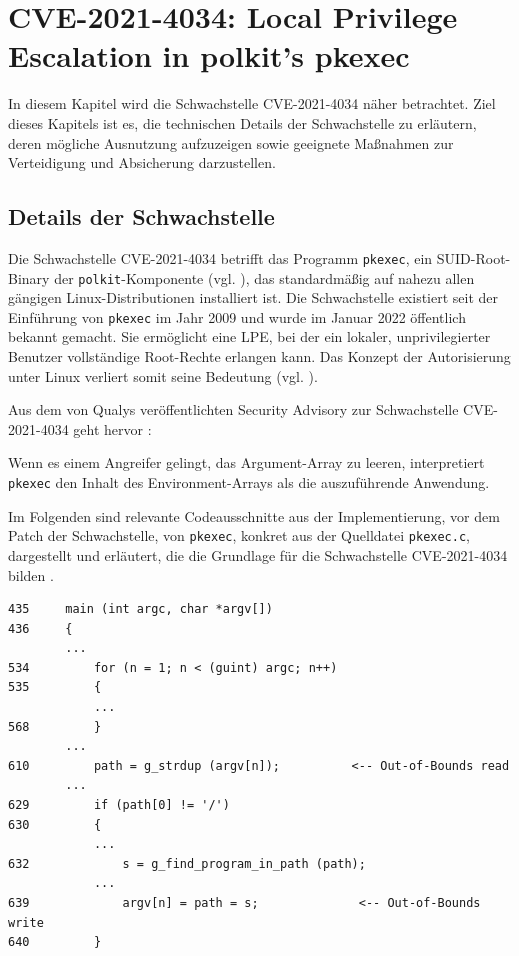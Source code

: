 \documentclass[oneside,11pt,a4paper,article,german]{memoir}
\begin{document}
\chapter{CVE-2021-4034: Local Privilege Escalation in polkit's pkexec}
In diesem Kapitel wird die Schwachstelle CVE-2021-4034 \cite{n3_cve_2021_4034} näher betrachtet.
Ziel dieses Kapitels ist es, die technischen Details der Schwachstelle zu erläutern, deren mögliche Ausnutzung aufzuzeigen
sowie geeignete Maßnahmen zur Verteidigung und Absicherung darzustellen.

\section{Details der Schwachstelle}

Die Schwachstelle CVE-2021-4034 betrifft das Programm \texttt{pkexec}, ein SUID-Root-Binary der \texttt{polkit}-Komponente (vgl. \cite{n2_ubuntuusers.de_polkit}),
das standardmäßig auf nahezu allen gängigen Linux-Distributionen installiert ist. Die Schwachstelle
existiert seit der Einführung von \texttt{pkexec} im Jahr 2009 und wurde im Januar 2022 öffentlich bekannt gemacht.
Sie ermöglicht eine LPE, bei der ein lokaler, unprivilegierter Benutzer vollständige
Root-Rechte erlangen kann. Das Konzept der Autorisierung unter Linux verliert somit seine Bedeutung (vgl. \cite{c16_qualys}).
\par
Aus dem von Qualys veröffentlichten Security Advisory zur Schwachstelle CVE-2021-4034 geht hervor \cite{c16_qualys}:
\par
Wenn es einem Angreifer gelingt, das Argument-Array zu leeren, interpretiert \texttt{pkexec} den Inhalt des Environment-Arrays
als die auszuführende Anwendung.
\par
Im Folgenden sind relevante Codeausschnitte aus der Implementierung, vor dem Patch der Schwachstelle, von \texttt{pkexec}, konkret aus der Quelldatei \texttt{pkexec.c}, dargestellt und erläutert, die die Grundlage für die Schwachstelle CVE-2021-4034 bilden \cite{c16_qualys}\cite{n7_pkexec_source_code}.
\par
\begin{lstlisting}[caption={relevante Ausschnitte aus main() von \texttt{pkexec.c} \cite{c16_qualys}\cite{n7_pkexec_source_code}}]
435     main (int argc, char *argv[])
436     {
        ...
534         for (n = 1; n < (guint) argc; n++)
535         {
            ...
568         }
        ...
610         path = g_strdup (argv[n]);          <-- Out-of-Bounds read
        ...
629         if (path[0] != '/')
630         {
            ...
632             s = g_find_program_in_path (path);
            ...
639             argv[n] = path = s;              <-- Out-of-Bounds write
640         }
\end{lstlisting}
\end{document}
